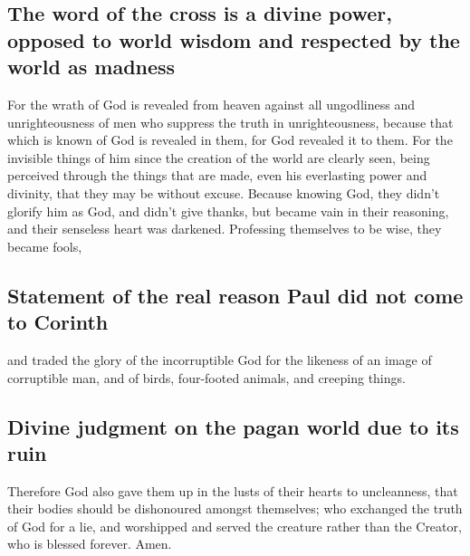 \hypertarget{the-word-of-the-cross-is-a-divine-power-opposed-to-world-wisdom-and-respected-by-the-world-as-madness}{%
\subsection{The word of the cross is a divine power, opposed to world
wisdom and respected by the world as
madness}\label{the-word-of-the-cross-is-a-divine-power-opposed-to-world-wisdom-and-respected-by-the-world-as-madness}}

 For the wrath of God is revealed from heaven against all
ungodliness and unrighteousness of men who suppress the truth in
unrighteousness,  because that which is known of God is
revealed in them, for God revealed it to them.  For the
invisible things of him since the creation of the world are clearly
seen, being perceived through the things that are made, even his
everlasting power and divinity, that they may be without excuse.
 Because knowing God, they didn't glorify him as God, and
didn't give thanks, but became vain in their reasoning, and their
senseless heart was darkened.  Professing themselves to
be wise, they became fools,

\hypertarget{statement-of-the-real-reason-paul-did-not-come-to-corinth}{%
\subsection{Statement of the real reason Paul did not come to
Corinth}\label{statement-of-the-real-reason-paul-did-not-come-to-corinth}}

 and traded the glory of the incorruptible God for the
likeness of an image of corruptible man, and of birds, four-footed
animals, and creeping things.

\hypertarget{divine-judgment-on-the-pagan-world-due-to-its-ruin}{%
\subsection{Divine judgment on the pagan world due to its
ruin}\label{divine-judgment-on-the-pagan-world-due-to-its-ruin}}

 Therefore God also gave them up in the lusts of their
hearts to uncleanness, that their bodies should be dishonoured amongst
themselves;  who exchanged the truth of God for a lie,
and worshipped and served the creature rather than the Creator, who is
blessed forever. Amen.

